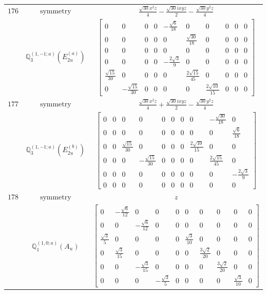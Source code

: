 \documentclass[fleqn,8pt,landscape]{jsarticle}
\begin{document}
\begin{longtable}{ccc}
$ 176 $ & $ \text{symmetry} $ & $ \frac{\sqrt{30} x^{2} z}{4} - \frac{\sqrt{30} i x y z}{2} - \frac{\sqrt{30} y^{2} z}{4} $ \\
$  $ & $ \mathbb{Q}_{3}^{(1,-1;a)}(E_{2u}^{(a)}) $ & $ \begin{bmatrix} 0 & 0 & 0 & 0 & - \frac{\sqrt{6}}{18} & 0 & 0 & 0 & 0 & 0 \\ 0 & 0 & 0 & 0 & 0 & \frac{\sqrt{30}}{18} & 0 & 0 & 0 & 0 \\ 0 & 0 & 0 & 0 & 0 & 0 & 0 & 0 & 0 & 0 \\ 0 & 0 & 0 & 0 & - \frac{2 \sqrt{3}}{9} & 0 & 0 & 0 & 0 & 0 \\ \frac{\sqrt{15}}{30} & 0 & 0 & 0 & 0 & \frac{2 \sqrt{15}}{45} & 0 & 0 & 0 & 0 \\ 0 & - \frac{\sqrt{15}}{30} & 0 & 0 & 0 & 0 & \frac{2 \sqrt{10}}{15} & 0 & 0 & 0 \end{bmatrix} $ \\ \hline
$ 177 $ & $ \text{symmetry} $ & $ \frac{\sqrt{30} x^{2} z}{4} + \frac{\sqrt{30} i x y z}{2} - \frac{\sqrt{30} y^{2} z}{4} $ \\
$  $ & $ \mathbb{Q}_{3}^{(1,-1;a)}(E_{2u}^{(b)}) $ & $ \begin{bmatrix} 0 & 0 & 0 & 0 & 0 & 0 & 0 & 0 & - \frac{\sqrt{30}}{18} & 0 \\ 0 & 0 & 0 & 0 & 0 & 0 & 0 & 0 & 0 & \frac{\sqrt{6}}{18} \\ 0 & 0 & \frac{\sqrt{15}}{30} & 0 & 0 & 0 & 0 & \frac{2 \sqrt{10}}{15} & 0 & 0 \\ 0 & 0 & 0 & - \frac{\sqrt{15}}{30} & 0 & 0 & 0 & 0 & \frac{2 \sqrt{15}}{45} & 0 \\ 0 & 0 & 0 & 0 & 0 & 0 & 0 & 0 & 0 & - \frac{2 \sqrt{3}}{9} \\ 0 & 0 & 0 & 0 & 0 & 0 & 0 & 0 & 0 & 0 \end{bmatrix} $ \\ \hline
$ 178 $ & $ \text{symmetry} $ & $ z $ \\
$  $ & $ \mathbb{Q}_{1}^{(1,0;a)}(A_{u}) $ & $ \begin{bmatrix} 0 & - \frac{\sqrt{6}}{12} & 0 & 0 & 0 & 0 & 0 & 0 & 0 & 0 \\ 0 & 0 & - \frac{\sqrt{6}}{12} & 0 & 0 & 0 & 0 & 0 & 0 & 0 \\ \frac{\sqrt{3}}{5} & 0 & 0 & 0 & 0 & \frac{\sqrt{3}}{10} & 0 & 0 & 0 & 0 \\ 0 & \frac{\sqrt{3}}{15} & 0 & 0 & 0 & 0 & \frac{3 \sqrt{2}}{20} & 0 & 0 & 0 \\ 0 & 0 & - \frac{\sqrt{3}}{15} & 0 & 0 & 0 & 0 & \frac{3 \sqrt{2}}{20} & 0 & 0 \\ 0 & 0 & 0 & - \frac{\sqrt{3}}{5} & 0 & 0 & 0 & 0 & \frac{\sqrt{3}}{10} & 0 \end{bmatrix} $ \\ \hline

\end{longtable}
\end{document}
